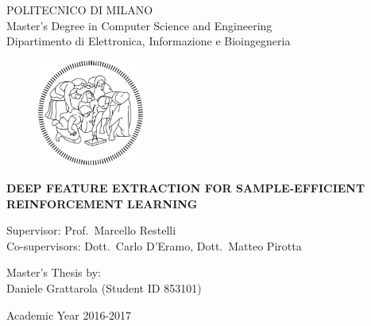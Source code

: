 \thispagestyle{empty}
\vspace*{-1.5cm} \bfseries{
    \begin{center}
	\large
	POLITECNICO DI MILANO                                                 \\
	\normalsize
	Master's Degree in Computer Science and Engineering                   \\
	Dipartimento di Elettronica, Informazione e Bioingegneria             \\  
	\vspace{0.6cm}
	\begin{figure}[htbp]
	    \begin{center}
	    \includegraphics[width=3.5cm]{pictures/logopm_cover}
	    \end{center}
	\end{figure}
	\vspace*{0.3cm} \LARGE
	\textbf{DEEP FEATURE EXTRACTION FOR SAMPLE-EFFICIENT REINFORCEMENT LEARNING}\\
	\vspace*{.75truecm} \large
    \end{center}

    \vspace*{3.0cm} \large
    
    \begin{flushleft}
	Supervisor: Prof.\ Marcello Restelli                                  \\
	Co-supervisors: Dott.\ Carlo D'Eramo, Dott.\ Matteo Pirotta
    \end{flushleft}
    
    \vspace*{1.0cm}

    \begin{flushright}
	Master's Thesis by:                                                   \\ 
	Daniele Grattarola (Student ID 853101)
    \end{flushright}
    
    \vspace*{0.5cm}

    \begin{center}
	Academic Year 2016-2017
    \end{center} \clearpage
}
